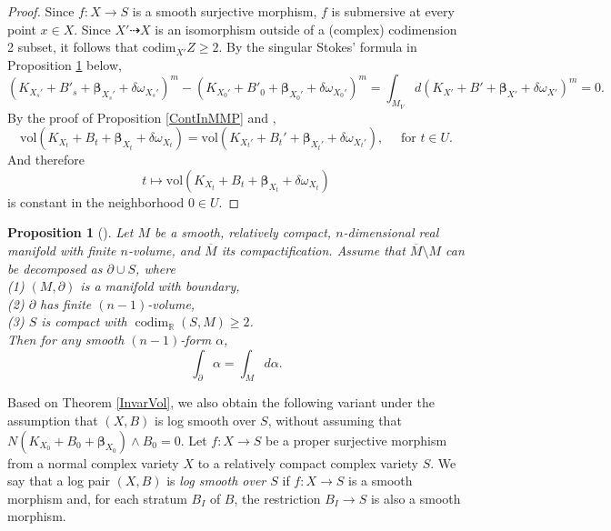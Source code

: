 \documentclass[12pt]{amsart}
\numberwithin{equation}{section}
\newtheorem{proposition}[theorem]{Proposition}
\theoremstyle{definition}
\theoremstyle{plain}
\newtheorem*{thm A*}{Theorem A}
\newtheorem*{thm B*}{Theorem B}
\newtheorem*{thm C*}{Theorem C}
\newtheorem*{thm D*}{Theorem D}
\theoremstyle{definition}
\renewcommand{\1}{\mathds{1}}
\newcommand{\vol}{\mathrm{vol}}
\newcommand{\bbeta}{\boldsymbol{\beta}}
\renewcommand{\>}{\rightarrow}
\begin{document}
\begin{proof}
Since $f:X\to S$ is a smooth surjective morphism, $f$ is submersive at every point $x\in X$. Since $X'\dasharrow X$ is an isomorphism outside of a (complex) codimension 2 subset, it follows that
$\mathrm{codim}_{X'}Z\ge 2 $. By the singular Stokes' formula in Proposition \ref{stokes} below, $$(K_{X_s'}+ B'_s  + \bbeta_{X_s'}  + \delta{\omega}_{X_s'})^m-(K_{X_0'}+ B'_0 + \bbeta_{X_0'} + \delta{\omega}_{X_0'})^m  = \int_{M_V}d (K_{X'}+B'+\bbeta_{X'}+ \delta {\omega}_{X'})^m =  0.$$By the proof of Proposition \ref{ContInMMP} and \cite[Corollary 3.2]{CRC25}, 
$$\vol(K_{X_t}+ B_t + \bbeta_{X_t}+ \delta {\omega}_{X_t}) = \vol (K_{X_t'}+ B_t' + \bbeta_{X_t'} + \delta {\omega}_{X_t'}),\quad \text{ for }t\in U.$$ And therefore
$$t \longmapsto \mathrm{vol}(K_{X_t}+B_t +  \boldsymbol{\beta}_{X_t} +\delta{\omega}_{X_t})$$ is constant in the neighborhood $0\in U$. 
\end{proof}


\begin{proposition}[{\cite[p.10]{Stolzenberg}}]\label{stokes}
Let $M$ be a smooth, relatively compact, $n$-dimensional real manifold with finite $n$-volume, and  $\overline{M}$ its compactification. 
Assume that $\overline{M} \setminus M$ can be decomposed as $\partial \cup S$, where\\
\emph{(1)} $(M, \partial)$ is a manifold with boundary,\\
\emph{(2)} $\partial$ has finite $(n-1)$-volume,\\
\emph{(3)} $S$ is compact with $\operatorname{codim}_{\mathbb{R}}(S, M) \ge 2$.\\
Then for any smooth $(n-1)$-form $\alpha$,
\[
\int_{\partial} \alpha = \int_M d\alpha.
\]
\end{proposition}

Based on Theorem \ref{InvarVol}, we also obtain the following variant under the assumption that $(X,B)$ is log smooth over $S$, without assuming that $N(K_{X_0} + B_0 + \bbeta_{X_0})\wedge B_0  = 0$. Let $f : X \to S$ be a proper surjective morphism from a normal complex variety $X$ to a relatively compact complex variety $S$. We say that a log pair $(X,B)$ is \emph{log smooth over $S$} if $f : X \to S$ is a smooth morphism and, for each stratum $B_I$ of $B$, the restriction $B_I \to S$ is also a smooth morphism.
 
\end{document}
